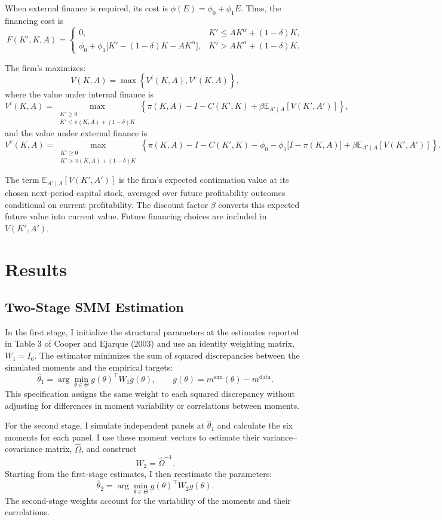 \documentclass{article}
\begin{document}
When external finance is required, its cost is
$\phi(E)=\phi_0+\phi_1 E$. Thus, the financing cost is
\[
F(K',K,A)=
\begin{cases}
0,
& K'\leq AK^\alpha+(1-\delta)K,\\[4pt]
\phi_0+\phi_1\bigl[K'-(1-\delta)K-AK^\alpha\bigr],
& K'>AK^\alpha+(1-\delta)K.
\end{cases}
\]

The firm's maximizes:
\[
V(K,A)=\max\left\{V^i(K,A),V^e(K,A)\right\},
\]
where the value under internal finance is
\[
V^i(K,A)=
\max_{\substack{K'\geq 0\\
K'\leq \pi(K,A)+(1-\delta)K}}
\left\{
\pi(K,A)-I-C(K',K)
+\beta\mathbb{E}_{A'\mid A}[V(K',A')]
\right\},
\]
and the value under external finance is
\[
V^e(K,A)=
\max_{\substack{K'\geq 0\\
K'>\pi(K,A)+(1-\delta)K}}
\left\{
\pi(K,A)-I-C(K',K)
-\phi_0-\phi_1\bigl[I-\pi(K,A)\bigr]
+\beta\mathbb{E}_{A'\mid A}[V(K',A')]
\right\}.
\]

The term $\mathbb{E}_{A'\mid A}[V(K',A')]$ is the firm's expected
continuation value at its chosen next-period capital stock,
averaged over future profitability outcomes conditional on current
profitability. The discount factor $\beta$ converts this expected
future value into current value. Future financing choices are
included in $V(K',A')$.


\section{Results}

\subsection{Two-Stage SMM Estimation}

In the first stage, I initialize the structural parameters at
the estimates reported in Table 3 of Cooper and Ejarque (2003)
and use an identity weighting matrix, $W_1=I_6$. The estimator
minimizes the sum of squared discrepancies between the simulated
moments and the empirical targets:
\[
\hat{\theta}_1
=
\arg\min_{\theta\in\Theta}
g(\theta)^\top W_1 g(\theta),
\qquad
g(\theta)=m^{\mathrm{sim}}(\theta)-m^{\mathrm{data}}.
\]
This specification assigns the same weight to each squared
discrepancy without adjusting for differences in moment
variability or correlations between moments.

For the second stage, I simulate independent panels at
$\hat{\theta}_1$ and calculate the six moments for each panel.
I use these moment vectors to estimate their variance--covariance
matrix, $\hat{\Omega}$, and construct
\[
W_2=\hat{\Omega}^{-1}.
\]
Starting from the first-stage estimates, I then reestimate
the parameters:
\[
\hat{\theta}_2
=
\arg\min_{\theta\in\Theta}
g(\theta)^\top W_2 g(\theta).
\]
The second-stage weights account for the variability of the
moments and their correlations.
\end{document}
